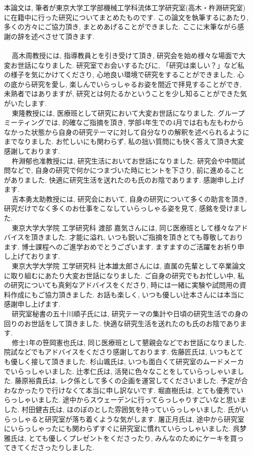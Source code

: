 本論文は, 筆者が東京大学工学部機械工学科流体工学研究室(高木・杵淵研究室)に在籍中に行った研究についてまとめたものです. この論文を執筆するにあたり, 多くの方々にご協力頂き, まとめあげることができました. ここに末筆ながら感謝の辞を述べさせて頂きます.
\\
\\\ \ \,高木周教授には, 指導教員とを引き受けて頂き, 研究会を始め様々な場面で大変お世話になりました. 研究室でお会いするたびに, 「研究は楽しい？」など私の様子を気にかけてくださり, 心地良い環境で研究をすることができました. 心の底から研究を愛し, 楽しんでいらっしゃるお姿を間近で拝見することができ, 未熟者ではありますが, 研究とは何たるかということを少し知ることができた気がいたします.
\\\ \ \,東隆教授には, 医療班として研究において大変お世話になりました. グループミーティングでは, 的確なご指摘を頂き, 学部4年生での4月では右も左もわからなかった状態から自身の研究テーマに対して自分なりの解釈を述べられるようにまでなりました. お忙しいにも関わらず, 私の拙い質問にも快く答えて頂き大変感謝しております. 
\\\ \ \,杵淵郁也准教授には, 研究生活においてお世話になりました. 研究会や中間試問などで, 自身の研究で何かにつまづいた時にヒントを下さり, 前に進めることがありました. 快適に研究生活を送れたのも氏のお陰であります. 感謝申し上げます. 
\\\ \ \,吉本勇太助教授には, 研究会において, 自身の研究について多くの助言を頂き, 研究だけでなく多くのお仕事をこなしていらっしゃる姿を見て, 感銘を受けました. 
\\\ \ \,東京大学大学院 工学研究科 渡部 嘉気さんには, 同じ医療班として様々なアドバイスを頂きました. 才能に溢れ, いつも鋭いご指摘を頂きとても尊敬しております. 博士課程へのご進学おめでとうございます. ますますのご活躍をお祈り申し上げております. 
\\\ \ \,東京大学大学院 工学研究科 辻本雄太郎さんには, 直属の先輩として卒業論文に取り組むにあたり大変お世話になりました. ご自身の研究でもお忙しい中, 私の研究についても真剣なアドバイスをくださり, 時には一緒に実験や試問用の資料作成にもご協力頂きました. お話も楽しく, いつも優しい辻本さんには本当に感謝申し上げます. 
\\\ \ \,研究室秘書の五十川順子氏には, 研究テーマの集計や日頃の研究生活での身の回りのお世話をして頂きました. 快適な研究生活を送れたのも氏のお陰であります. 
\\\ \ \,修士1年の笹岡憲也氏は, 同じ医療班として懇親会などでお世話になりました. 院試などでもアドバイスをくださり感謝しております. 佐藤匠氏は, いつもとても優しく接して頂きました. 杉山颯氏は, いつも面白くて研究室のムードメーカでいらっしゃいました. 辻孝仁氏は, 活発に色々なことをしていらっしゃいました. 藤原裕貴氏は, レク係として多くの企画を運営してくださいました. 予定が合わなかったりで行けなくて本当に申し訳ないです. 堀直樹氏は, とても優秀でいらっしゃいました. 途中からスウェーデンに行ってらっしゃりすごいなと思いました. 村田健吉氏は, ほのぼのとした雰囲気を持っていらっしゃいました. 氏がいらっしゃると研究室が落ち着くような気がします. 屠正月氏は, 途中から研究室にいらっしゃったにも関わらずすぐに研究室に慣れていらっしゃいました. 呉梦雅氏は, とても優しくプレゼントをくださったり, みんなのためにケーキを買ってきてくださったりしました. 
